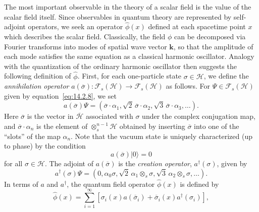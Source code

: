 The most important observable in the theory of a scalar field is the value of the
scalar field itself. Since observables in quantum theory are represented by
self-adjoint operators, we seek an operator \(\widehat\phi(x)\) defined at each
spacetime point \(x\) which describes the scalar field. Classically, the field \(\phi\)
can be decomposed via Fourier transforms into modes of spatial wave vector
\(\boldsymbol{k}\), so that the amplitude of each mode satisfies the same equation as
a classical harmonic oscillator. Analogy with the quantization of the ordinary
harmonic oscillator then suggests the following definition of \(\widehat\phi\). First,
for each one-particle state \(\sigma\in\mathcal H\), we define the \emph{annihilation
operator} \(a(\overline\sigma):\mathcal F_s(\mathcal H)\longrightarrow
\mathcal F_s(\mathcal H)\) as follows. For
\(\Psi\in\mathcal F_s(\mathcal H)\) given by equation~\eqref{eq:14.2.8}, we set
\begin{equation}
  a(\overline\sigma)\Psi
  =(\overline\sigma\mathbin{\cdot}\alpha_1,
    \sqrt2\,\overline\sigma\mathbin{\cdot}\alpha_2,
    \sqrt3\,\overline\sigma\mathbin{\cdot}\alpha_3,\ldots).
  \tag{14.2.10}\label{eq:14.2.10}
\end{equation}
Here \(\overline\sigma\) is the vector in \(\overline{\mathcal H}\) associated with
\(\sigma\) under the complex conjugation map, and
\(\overline\sigma\mathbin{\cdot}\alpha_n\) is the element of
\(\otimes_s^{n-1}\mathcal H\) obtained by inserting \(\overline\sigma\) into one
of the ``slots'' of the map \(\alpha_n\). Note that the vacuum state is uniquely
characterized (up to phase) by the condition
\begin{equation}
  a(\overline\sigma)\lvert0\rangle=0
  \tag{14.2.11}\label{eq:14.2.11}
\end{equation}
for all \(\sigma\in\mathcal H\). The adjoint of \(a(\overline\sigma)\) is the
\emph{creation operator}, \(a^\dagger(\sigma)\), given by
\begin{equation}
  a^\dagger(\sigma)\Psi
  =(0,\alpha_0\sigma,\sqrt2\,\alpha_1\otimes_s\sigma,
    \sqrt3\,\alpha_2\otimes_s\sigma,\ldots).
  \tag{14.2.12}\label{eq:14.2.12}
\end{equation}
In terms of \(a\) and \(a^\dagger\), the quantum field operator
\(\widehat\phi(x)\) is defined by
\begin{equation}
  \widehat\phi(x)=\sum_{i=1}^{\infty}
  \left[\sigma_i(x)a(\overline\sigma_i)
  +\overline\sigma_i(x)a^\dagger(\sigma_i)\right],
  \tag{14.2.13}\label{eq:14.2.13}
\end{equation}
